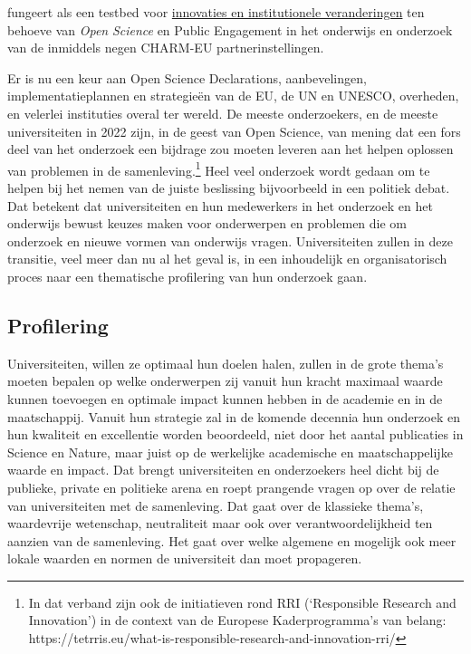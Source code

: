 \documentclass[empirical, authordate, ]{new-jote-article}
\begin{document}
\begin{bookboxnotitle}
fungeert als een testbed voor \href{https://www.charm-eu.eu/torch}{innovaties en institutionele veranderingen} ten behoeve van \emph{Open }\emph{Science} en Public Engagement in het onderwijs en onderzoek van de inmiddels negen CHARM-EU partnerinstellingen.
	\end{bookboxnotitle}

	Er is nu een keur aan Open Science Declarations, aanbevelingen, implementatieplannen en strategieën van de EU, de UN en UNESCO, overheden, en velerlei instituties overal ter wereld. De meeste onderzoekers, en de meeste universiteiten in 2022 zijn, in de geest van Open Science, van mening dat een fors deel van het onderzoek een bijdrage zou moeten leveren aan het helpen oplossen van problemen in de samenleving.\footnote{In dat verband zijn ook de initiatieven rond RRI (‘Responsible Research and Innovation') in de context van de Europese Kaderprogramma's van belang: https://tetrris.eu/what-is-responsible-research-and-innovation-rri/} Heel veel onderzoek wordt gedaan om te helpen bij het nemen van de juiste beslissing bijvoorbeeld in een politiek debat. Dat betekent dat universiteiten en hun medewerkers in het onderzoek en het onderwijs bewust keuzes maken voor onderwerpen en problemen die om onderzoek en nieuwe vormen van onderwijs vragen. Universiteiten zullen in deze transitie, veel meer dan nu al het geval is, in een inhoudelijk en organisatorisch proces naar een thematische profilering van hun onderzoek gaan.



	\subsection{Profilering}



	Universiteiten, willen ze optimaal hun doelen halen, zullen in de grote thema's moeten bepalen op welke onderwerpen zij vanuit hun kracht maximaal waarde kunnen toevoegen en optimale impact kunnen hebben in de academie en in de maatschappij. Vanuit hun strategie zal in de komende decennia hun onderzoek en hun kwaliteit en excellentie worden beoordeeld, niet door het aantal publicaties in Science en Nature, maar juist op de werkelijke academische en maatschappelijke waarde en impact. Dat brengt universiteiten en onderzoekers heel dicht bij de publieke, private en politieke arena en roept prangende vragen op over de relatie van universiteiten met de samenleving. Dat gaat over de klassieke thema's, waardevrije wetenschap, neutraliteit maar ook over verantwoordelijkheid ten aanzien van de samenleving. Het gaat over welke algemene en mogelijk ook meer lokale waarden en normen de universiteit dan moet propageren.
\end{document}
